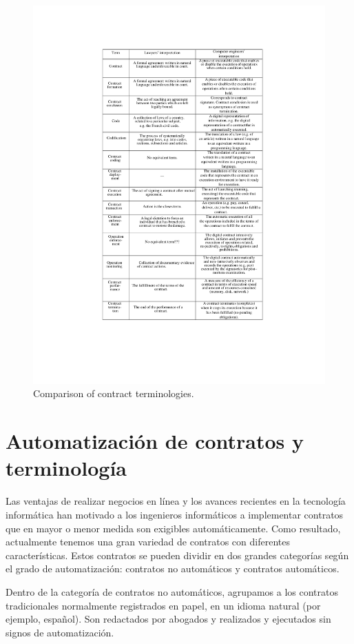 \documentclass[12pt]{report} %
\begin{document}
\begin{figure}
\centering
\includegraphics[width=0.85\columnwidth]{imagenes/terminosdiferentescontratos.pdf}
\caption{Comparison of contract terminologies.}
\label{terminosdiferentesontratos}
\end{figure} 




\section{Automatización de contratos y terminología}

Las ventajas de realizar negocios en línea y los avances recientes en la tecnología informática han motivado a los ingenieros informáticos a implementar contratos que en mayor o menor medida son exigibles automáticamente. Como resultado, actualmente tenemos una gran variedad de contratos con diferentes características. Estos contratos se pueden dividir en dos grandes categorías según el grado de automatización: contratos no automáticos y contratos automáticos. 

Dentro de la categoría de contratos no automáticos, agrupamos a los contratos tradicionales normalmente registrados en papel, en un idioma natural (por ejemplo, español). Son redactados por abogados y realizados y ejecutados sin signos de automatización. 
\end{document}
